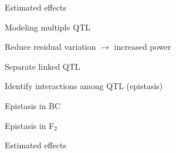 \documentclass[aspectratio=169,12pt,t]{beamer}
\begin{document}
\begin{frame}{Estimated effects}


\end{frame}






\begin{frame}{Modeling multiple QTL}

\bbi
\item Reduce residual variation $\longrightarrow$ increased power
\item Separate linked QTL
\item Identify interactions among QTL {\lolit (epistasis)}
\ei
\end{frame}






\begin{frame}[c]{Epistasis in BC}


\end{frame}






\begin{frame}[c]{Epistasis in F$_{\mathsf{2}}$}


\end{frame}











\begin{frame}[c]{Estimated effects}


\end{frame}
\end{document}
